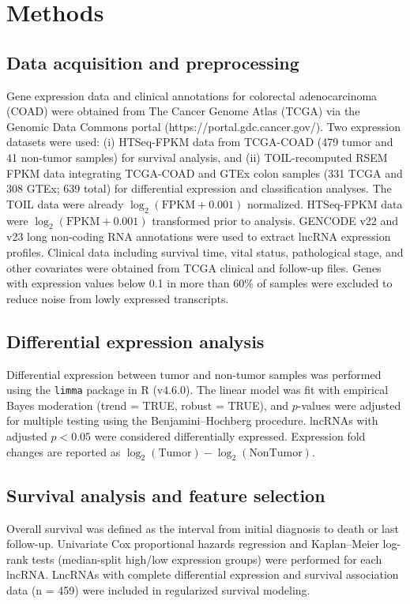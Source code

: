 \documentclass[fleqn,10pt]{wlscirep}
\begin{document}
\section*{Methods}

\subsection*{Data acquisition and preprocessing}

Gene expression data and clinical annotations for colorectal adenocarcinoma (COAD) were obtained from The Cancer Genome Atlas (TCGA) via the Genomic Data Commons portal (https://portal.gdc.cancer.gov/). Two expression datasets were used: (i) HTSeq-FPKM data from TCGA-COAD (479 tumor and 41 non-tumor samples) for survival analysis, and (ii) TOIL-recomputed RSEM FPKM data integrating TCGA-COAD and GTEx colon samples (331 TCGA and 308 GTEx; 639 total) for differential expression and classification analyses. The TOIL data were already $\log_2(\text{FPKM} + 0.001)$ normalized. HTSeq-FPKM data were $\log_2(\text{FPKM} + 0.001)$ transformed prior to analysis. GENCODE v22 and v23 long non-coding RNA annotations were used to extract lncRNA expression profiles. Clinical data including survival time, vital status, pathological stage, and other covariates were obtained from TCGA clinical and follow-up files. Genes with expression values below 0.1 in more than 60\% of samples were excluded to reduce noise from lowly expressed transcripts.

\subsection*{Differential expression analysis}

Differential expression between tumor and non-tumor samples was performed using the \texttt{limma} package in R (v4.6.0). The linear model was fit with empirical Bayes moderation (trend = TRUE, robust = TRUE), and $p$-values were adjusted for multiple testing using the Benjamini--Hochberg procedure. lncRNAs with adjusted $p < 0.05$ were considered differentially expressed. Expression fold changes are reported as $\log_2(\text{Tumor}) - \log_2(\text{NonTumor})$.

\subsection*{Survival analysis and feature selection}

Overall survival was defined as the interval from initial diagnosis to death or last follow-up. Univariate Cox proportional hazards regression and Kaplan--Meier log-rank tests (median-split high/low expression groups) were performed for each lncRNA. LncRNAs with complete differential expression and survival association data (n = 459) were included in regularized survival modeling.
\end{document}
